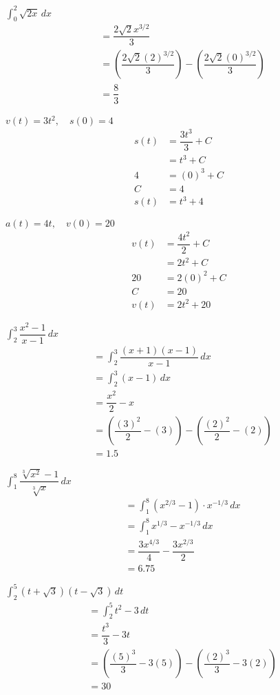 \documentclass[12pt]{article}
\newenvironment{problem}[2][]{
    \begin{trivlist}
        \item[
            {\bfseries #1}
            {\bfseries #2.}
        ]
}{\end{trivlist}}
\begin{document}
\begin{problem}{57}
$\displaystyle\int_0^2 \sqrt{2x} \, dx$
\begin{align}
&= \dfrac{2\sqrt{2} x^{3/2}}{3} \\
&= \left(\dfrac{2\sqrt{2} (2)^{3/2}}{3}\right) - \left(\dfrac{2\sqrt{2} (0)^{3/2}}{3}\right) \\
&= \dfrac{8}{3}
\end{align}
\end{problem}

\begin{problem}{73}
$v(t) = 3t^2, \quad s(0) = 4$
\begin{align}
s(t) &= \dfrac{3t^3}{3} + C \\
&= t^3 + C \\
4 &= (0)^3 + C \\
C &= 4 \\
s(t) &= t^3 + 4
\end{align}
\end{problem}

\begin{problem}{75}
$a(t) = 4t, \quad v(0) = 20$
\begin{align}
v(t) &= \dfrac{4t^2}{2} + C \\
&= 2t^2 + C \\
20 &= 2(0)^2 + C \\
C &= 20 \\
v(t) &= 2t^2 + 20
\end{align}
\end{problem}

\begin{problem}{93}
$\displaystyle\int_2^3 \dfrac{x^2 - 1}{x - 1} \, dx$
\begin{align}
&= \int_2^3 \dfrac{(x + 1)(x - 1)}{x - 1} \, dx \\
&= \int_2^3 (x - 1) \, dx \\
&= \dfrac{x^2}{2} - x \\
&= \left(\dfrac{(3)^2}{2} - (3)\right) - \left(\dfrac{(2)^2}{2} - (2)\right) \\
&= 1.5
\end{align}
\end{problem}

\begin{problem}{97}
$\displaystyle\int_1^8 \dfrac{\sqrt[3]{x^2} - 1}{\sqrt[3]{x}} \, dx$
\begin{align}
&= \int_1^8 (x^{2/3} - 1) \cdot x^{-1/3} \, dx \\
&= \int_1^8 x^{1/3} - x^{-1/3} \, dx \\
&= \dfrac{3x^{4/3}}{4} - \dfrac{3x^{2/3}}{2} \\
&= 6.75
\end{align}
\end{problem}

\begin{problem}{99}
$\displaystyle\int_2^5 (t + \sqrt{3})(t - \sqrt{3}) \, dt$
\begin{align}
&= \int_2^5 t^2 - 3 \, dt \\
&= \dfrac{t^3}{3} - 3t \\
&= \left(\dfrac{(5)^3}{3} - 3(5)\right) - \left(\dfrac{(2)^3}{3} - 3(2)\right) \\
&= 30
\end{align}
\end{problem}
\end{document}
